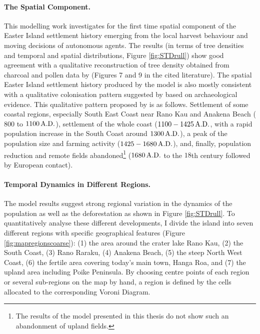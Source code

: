 \paragraph{The Spatial Component.}
This modelling work investigates for the first time spatial component of the Easter Island settlement history emerging from the local harvest behaviour and moving decisions of autonomous agents.
The results (in terms of tree densities and temporal and spatial distributions, Figure \ref{fig:STDrull}) show good agreement with a qualitative reconstruction of tree density obtained from charcoal and pollen data by \citet{Rull2020} (Figures 7 and 9 in the cited literature).
The spatial Easter Island settlement history produced by the model is also mostly consistent with a qualitative colonisation pattern suggested by \citet{Bahn2017} based on archaeological evidence.
This qualitative pattern proposed by \citet{Bahn2017} is as follows.
Settlement of some coastal regions, especially South East Coast near Rano Kau and Anakena Beach ($800$ to $1100\, {\rm A.D.}$), settlement of the whole coast ($1100-1425\,{\rm A.D.}$, with a rapid population increase in the South Coast around $1300\, {\rm A.D.}$), a peak of the population size and farming activity ($1425-1680\, {\rm A.D.}$), and, finally, population reduction and remote fields abandoned\footnote{The results of the model presented in this thesis do not show such an abandonment of upland fields.} ($1680\,{\rm A.D.}$ to the $18$th century followed by European contact).


\paragraph{Temporal Dynamics in Different Regions.}
The model results suggest strong regional variation in the dynamics of the population as well as the deforestation as shown in Figure \ref{fig:STDrull}. 
To quantitatively analyse these different developments, I divide the island into seven different regions with specific geographical features (Figure \ref{fig:mapregionscoarse}): (1) the area around the crater lake Rano Kau, (2) the South Coast, (3) Rano Raraku, (4) Anakena Beach, (5) the steep North West Coast, (6) the fertile area covering today's main town, Hanga Roa, and (7) the upland area including Poike Peninsula. 
By choosing centre points of each region or several sub-regions on the map by hand, a region is defined by the cells allocated to the corresponding Voroni Diagram.


